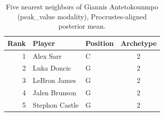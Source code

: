 \begin{table}[htbp]
  \centering\small
  \begin{tabular}{rllc}
    \toprule
    Rank & Player & Position & Archetype \\
    \midrule
    1 & Alex Sarr & C & 2 \\
    2 & Luka Doncic & G & 2 \\
    3 & LeBron James & G & 2 \\
    4 & Jalen Brunson & G & 2 \\
    5 & Stephon Castle & G & 2 \\
    \bottomrule
  \end{tabular}
  \caption{Five nearest neighbors of Giannis Antetokounmpo (peak_value modality), Procrustes-aligned posterior mean.}
  \label{tab:Giannis_Antetokounmpo_neighbors_peak_value}
\end{table}

